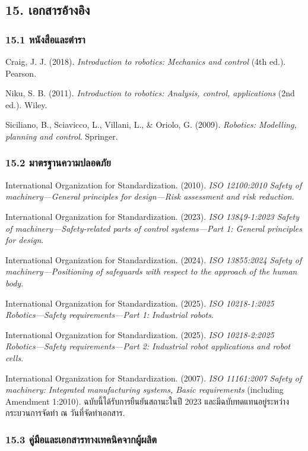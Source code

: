 \subsection{15. เอกสารอ้างอิง}

\subsubsection{15.1 หนังสือและตำรา}

Craig, J. J. (2018). \textit{Introduction to robotics: Mechanics and control} (4th ed.). Pearson.

Niku, S. B. (2011). \textit{Introduction to robotics: Analysis, control, applications} (2nd ed.). Wiley.

Siciliano, B., Sciavicco, L., Villani, L., \& Oriolo, G. (2009). \textit{Robotics: Modelling, planning and control}. Springer.

\subsubsection{15.2 มาตรฐานความปลอดภัย}

International Organization for Standardization. (2010). \textit{ISO 12100:2010 Safety of machinery—General principles for design—Risk assessment and risk reduction}.

International Organization for Standardization. (2023). \textit{ISO 13849-1:2023 Safety of machinery—Safety-related parts of control systems—Part 1: General principles for design}.

International Organization for Standardization. (2024). \textit{ISO 13855:2024 Safety of machinery—Positioning of safeguards with respect to the approach of the human body}.

International Organization for Standardization. (2025). \textit{ISO 10218-1:2025 Robotics—Safety requirements—Part 1: Industrial robots}.

International Organization for Standardization. (2025). \textit{ISO 10218-2:2025 Robotics—Safety requirements—Part 2: Industrial robot applications and robot cells}.

International Organization for Standardization. (2007). \textit{ISO 11161:2007 Safety of machinery: Integrated manufacturing systems, Basic requirements} (including Amendment 1:2010). ฉบับนี้ได้รับการยืนยันสถานะในปี 2023 และมีฉบับทดแทนอยู่ระหว่างกระบวนการจัดทำ ณ วันที่จัดทำเอกสาร.

\subsubsection{15.3 คู่มือและเอกสารทางเทคนิคจากผู้ผลิต}

